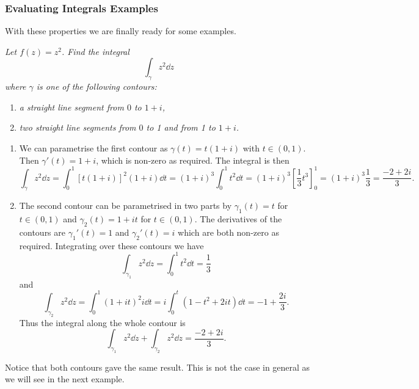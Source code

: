 \documentclass{article}
\begin{document}
    \subsubsection{Evaluating Integrals Examples}
    With these properties we are finally ready for some examples.
    \begin{example}\label{exa:integral 1}
        \textit{
            Let \(f(z) = z^2\).
            Find the integral
        }
            \[\int_{\gamma} z^2 \dd{z}\]
        \textit{
            where \(\gamma\) is one of the following contours:
        }
        \begin{enumerate}[label=\textit{\arabic*.}]
            \item \textit{a straight line segment from \(0\) to \(1 + i\),}
            \item \textit{two straight line segments from \(0\) to 1 and from 1 to \(1 + i\).}
        \end{enumerate}

        \begin{enumerate}
            \item We can parametrise the first contour as \(\gamma(t) = t(1 + i)\) with \(t\in(0, 1)\).
            Then \(\gamma'(t) = 1 + i\), which is non-zero as required.
            The integral is then
            \[\int_\gamma z^2 \dd{z} = \int_0^1 [t(1 + i)]^2(1 + i) \dd{t} = (1 + i)^3\int_0^1 t^2\dd{t} = (1 + i)^3\left[\frac{1}{3}t^3\right]_0^1 = (1 + i)^3\frac{1}{3} = \frac{-2 + 2i}{3}.\]
            
            \item The second contour can be parametrised in two parts by \(\gamma_1(t) = t\) for \(t\in(0, 1)\) and \(\gamma_2(t) = 1 + it\) for \(t\in(0, 1)\).
            The derivatives of the contours are \(\gamma_1'(t) = 1\) and \(\gamma_2'(t) = i\) which are both non-zero as required.
            Integrating over these contours we have
            \[\int_{\gamma_1} z^2\dd{z} = \int_0^1 t^2 \dd{t} = \frac{1}{3}\]
            and
            \[\int_{\gamma_2} z^2 \dd{z} = \int_0^1 (1 + it)^2i\dd{t} = i\int_0^t (1 - t^2 + 2it)\dd{t} = -1 + \frac{2i}{3}.\]
            Thus the integral along the whole contour is
            \[\int_{\gamma_1}z^2\dd{z} + \int_{\gamma_2}z^2\dd{z} = \frac{-2 + 2i}{3}.\]
        \end{enumerate}
        Notice that both contours gave the same result.
        This is not the case in general as we will see in the next example.
    \end{example}
\end{document}
